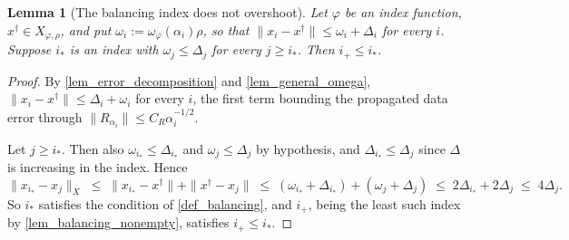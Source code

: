 \documentclass[a4paper]{report}
\theoremstyle{plain}
\newtheorem{lemma}[theorem]{Lemma}
\theoremstyle{definition}
\theoremstyle{remark}
\newcommand{\dg}{^{\dagger}}
\begin{document}
\begin{lemma}[The balancing index does not overshoot]
  \label{lem_balancing_le_star}
  Let $\varphi$ be an index function, $x\dg \in X_{\varphi,\rho}$, and put
  $\omega_i := \omega_{\varphi}(\alpha_i)\rho$, so that
  $\|x_i - x\dg\| \le \omega_i + \Delta_i$ for every $i$.  Suppose $i_{*}$ is an index
  with $\omega_j \le \Delta_j$ for every $j \ge i_{*}$.  Then $i_{+} \le i_{*}$.
\end{lemma}
\begin{proof}
  By \cref{lem_error_decomposition} and \cref{lem_general_omega},
  $\|x_i-x\dg\| \le \Delta_i + \omega_i$ for every $i$, the first term bounding the
  propagated data error through $\|R_{\alpha_i}\| \le C_R\alpha_i^{-1/2}$.

  Let $j \ge i_{*}$.  Then also $\omega_{i_{*}} \le \Delta_{i_{*}}$ and
  $\omega_j \le \Delta_j$ by hypothesis, and $\Delta_{i_{*}} \le \Delta_j$ since $\Delta$
  is increasing in the index.  Hence
  \[
    \|x_{i_{*}} - x_j\|_X \;\le\; \|x_{i_{*}}-x\dg\| + \|x\dg-x_j\|
      \;\le\; (\omega_{i_{*}}+\Delta_{i_{*}}) + (\omega_j+\Delta_j)
      \;\le\; 2\Delta_{i_{*}} + 2\Delta_j \;\le\; 4\Delta_j .
  \]
  So $i_{*}$ satisfies the condition of \cref{def_balancing}, and $i_{+}$, being the least
  such index by \cref{lem_balancing_nonempty}, satisfies $i_{+} \le i_{*}$.
\end{proof}
\end{document}
